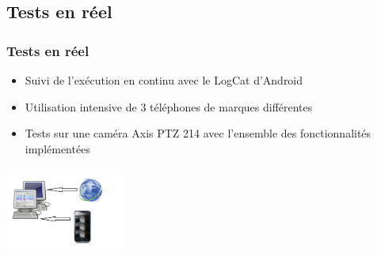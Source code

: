 \subsection{Tests en réel}
 \begin{frame}
\begin{minipage}{0.59\textwidth}
   \frametitle{Tests en réel}
\begin{itemize}
    \item Suivi de l'exécution en continu avec le LogCat d'Android
    \item Utilisation intensive de 3 téléphones de marques différentes
    \item Tests sur une caméra Axis PTZ 214 avec l'ensemble des
    fonctionnalités implémentées
   \end{itemize}
\end{minipage}
\begin{minipage}{0.39\textwidth}
 \includegraphics[width=4cm, height=3cm]{Images/ImageSlide13.png}
\end{minipage}
\end{frame}